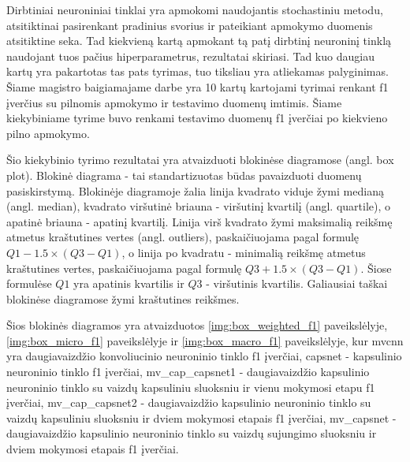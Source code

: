 Dirbtiniai neuroniniai tinklai yra apmokomi naudojantis stochastiniu metodu, atsitiktinai pasirenkant pradinius svorius ir pateikiant apmokymo duomenis atsitiktine seka. Tad kiekvieną kartą apmokant tą patį dirbtinį neuroninį tinklą naudojant tuos pačius hiperparametrus, rezultatai skiriasi. Tad kuo daugiau kartų yra pakartotas tas pats tyrimas, tuo tiksliau yra atliekamas palyginimas. Šiame magistro baigiamajame darbe yra 10 kartų kartojami tyrimai renkant f1 įverčius su pilnomis apmokymo ir testavimo duomenų imtimis. Šiame kiekybiniame tyrime buvo renkami testavimo duomenų f1 įverčiai po kiekvieno pilno apmokymo.


Šio kiekybinio tyrimo rezultatai yra atvaizduoti blokinėse diagramose (angl. box plot). Blokinė diagrama - tai standartizuotas būdas pavaizduoti duomenų pasiskirstymą. Blokinėje diagramoje žalia linija kvadrato viduje žymi medianą (angl. median), kvadrato viršutinė briauna - viršutinį kvartilį (angl. quartile), o apatinė briauna - apatinį kvartilį. Linija virš kvadrato žymi maksimalią reikšmę atmetus kraštutines vertes (angl. outliers), paskaičiuojama pagal formulę $Q1 - 1.5 \times (Q3 - Q1)$, o linija po kvadratu - minimalią reikšmę atmetus kraštutines vertes, paskaičiuojama pagal formulę $Q3 + 1.5 \times (Q3 - Q1)$. Šiose formulėse $Q1$ yra apatinis kvartilis ir $Q3$ - viršutinis kvartilis. Galiausiai taškai blokinėse diagramose žymi kraštutines reikšmes.

Šios blokinės diagramos yra atvaizduotos \ref{img:box_weighted_f1} paveikslėlyje, \ref{img:box_micro_f1} paveikslėlyje ir \ref{img:box_macro_f1} paveikslėlyje, kur
mvcnn yra daugiavaizdžio konvoliucinio neuroninio tinklo f1 įverčiai, capsnet - kapsulinio neuroninio tinklo f1 įverčiai, 
mv\_cap\_capsnet1 - daugiavaizdžio kapsulinio neuroninio tinklo su vaizdų kapsuliniu sluoksniu ir vienu mokymosi etapu f1 įverčiai, 
mv\_cap\_capsnet2 - daugiavaizdžio kapsulinio neuroninio tinklo su vaizdų kapsuliniu sluoksniu ir dviem mokymosi etapais f1 įverčiai,
mv\_capsnet - daugiavaizdžio kapsulinio neuroninio tinklo su vaizdų sujungimo sluoksniu ir dviem mokymosi etapais f1 įverčiai.

